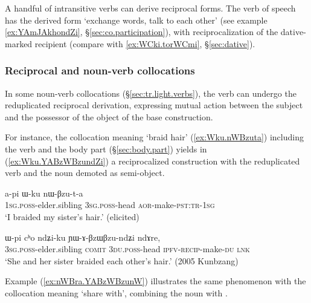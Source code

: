 A handful of intransitive verbs can derive reciprocal forms. The verb of speech  has the derived form  `exchange words, talk to each other' (see example \ref{ex:YAmJAkhondZi}, §\ref{sec:co.participation}), with reciprocalization of the dative-marked recipient (compare with \ref{ex:WCki.torWCmi}, §\ref{sec:dative}).

\subsubsection{Reciprocal and noun-verb collocations} \label{sec:reciprocal.collocation}
In some noun-verb collocations (§\ref{sec:tr.light.verbs}), the verb can undergo the reduplicated reciprocal derivation, expressing mutual action between the subject and the possessor of the object of the base construction.

For instance, the collocation meaning `braid hair' (\ref{ex:Wku.nWBzuta}) including the verb  and the body part  (§\ref{sec:body.part}) yields in (\ref{ex:Wku.YABzWBzundZi}) a reciprocalized construction with the reduplicated verb  and the noun  demoted as semi-object.

\begin{exe}
\ex \label{ex:Wku.nWBzuta}
\gll  a-pi ɯ-ku nɯ-βzu-t-a \\
\textsc{1sg}.\textsc{poss}-elder.sibling \textsc{3sg}.\textsc{poss}-head \textsc{aor}-make-\textsc{pst}:\textsc{tr}-\textsc{1sg} \\
\glt `I braided my sister's hair.' (elicited)
\end{exe}

\begin{exe}
\ex \label{ex:Wku.YABzWBzundZi}
\gll ɯ-pi cʰo ndʑi-ku ɲɯ-ɤ-βzɯ\redp{}βzu-ndʑi ndɤre, \\
\textsc{3sg}.\textsc{poss}-elder.sibling \textsc{comit} \textsc{3du}.\textsc{poss}-head \textsc{ipfv}-\textsc{recip}-make-\textsc{du} \textsc{lnk} \\
\glt `She and her sister braided each other's hair.' (2005 Kunbzang)
\end{exe}

Example (\ref{ex:nWBra.YABzWBzunW}) illustrates the same phenomenon with the collocation meaning `share with', combining the noun  with .

